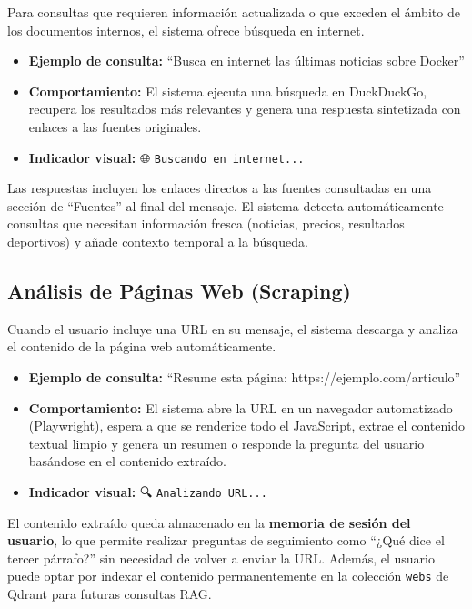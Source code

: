 Para consultas que requieren información actualizada o que exceden el ámbito de los documentos internos, el sistema ofrece búsqueda en internet.

\begin{itemize}
    \item \textbf{Ejemplo de consulta:} ``Busca en internet las últimas noticias sobre Docker''
    \item \textbf{Comportamiento:} El sistema ejecuta una búsqueda en DuckDuckGo, recupera los resultados más relevantes y genera una respuesta sintetizada con enlaces a las fuentes originales.
    \item \textbf{Indicador visual:} 🌐 \texttt{Buscando en internet...}
\end{itemize}

Las respuestas incluyen los enlaces directos a las fuentes consultadas en una sección de ``Fuentes'' al final del mensaje. El sistema detecta automáticamente consultas que necesitan información fresca (noticias, precios, resultados deportivos) y añade contexto temporal a la búsqueda.

\subsection{Análisis de Páginas Web (Scraping)}
\label{subsec:modo-scraping}

Cuando el usuario incluye una URL en su mensaje, el sistema descarga y analiza el contenido de la página web automáticamente.

\begin{itemize}
    \item \textbf{Ejemplo de consulta:} ``Resume esta página: https://ejemplo.com/articulo''
    \item \textbf{Comportamiento:} El sistema abre la URL en un navegador automatizado (Playwright), espera a que se renderice todo el JavaScript, extrae el contenido textual limpio y genera un resumen o responde la pregunta del usuario basándose en el contenido extraído.
    \item \textbf{Indicador visual:} 🔍 \texttt{Analizando URL...}
\end{itemize}

El contenido extraído queda almacenado en la \textbf{memoria de sesión del usuario}, lo que permite realizar preguntas de seguimiento como ``¿Qué dice el tercer párrafo?'' sin necesidad de volver a enviar la URL. Además, el usuario puede optar por indexar el contenido permanentemente en la colección \texttt{webs} de Qdrant para futuras consultas RAG.

